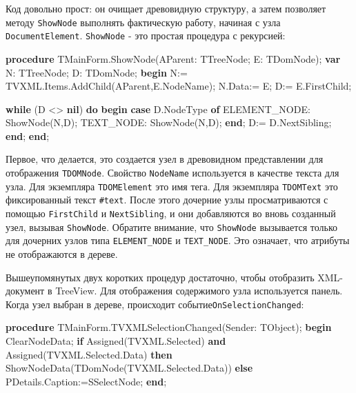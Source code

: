 \documentclass[
]{article}
\newenvironment{Shaded}{}{}
\newcommand{\KeywordTok}[1]{\textcolor[rgb]{0.00,0.44,0.13}{\textbf{#1}}}
\newcommand{\NormalTok}[1]{#1}
\begin{document}
Код довольно прост: он очищает древовидную структуру, а затем позволяет
методу \texttt{ShowNode} выполнять фактическую работу, начиная с узла
\texttt{DocumentElement}. \texttt{ShowNode} - это простая процедура с
рекурсией:

\begin{Shaded}
\begin{Highlighting}[]
\KeywordTok{procedure}\NormalTok{ TMainForm.ShowNode(AParent: TTreeNode; E: TDomNode);}
\KeywordTok{var}
\NormalTok{  N: TTreeNode;}
\NormalTok{  D: TDomNode;}
\KeywordTok{begin}
\NormalTok{  N:= TVXML.Items.AddChild(AParent,E.NodeName);}
\NormalTok{  N.Data:= E;}
\NormalTok{  D:= E.FirstChild;}

  \KeywordTok{while}\NormalTok{ (D \textless{}\textgreater{} }\KeywordTok{nil}\NormalTok{) }\KeywordTok{do}
  \KeywordTok{begin}
    \KeywordTok{case}\NormalTok{ D.NodeType }\KeywordTok{of}
\NormalTok{      ELEMENT\_NODE: ShowNode(N,D);}
\NormalTok{         TEXT\_NODE: ShowNode(N,D);}
    \KeywordTok{end}\NormalTok{;}
\NormalTok{    D:= D.NextSibling;}
  \KeywordTok{end}\NormalTok{;}
\KeywordTok{end}\NormalTok{;}
\end{Highlighting}
\end{Shaded}

Первое, что делается, это создается узел в древовидном представлении для
отображения \texttt{TDOMNode}. Свойство \texttt{NodeName} используется в
качестве текста для узла. Для экземпляра \texttt{TDOMElement} это имя
тега. Для экземпляра \texttt{TDOMText} это фиксированный текст
\texttt{\#text}. После этого дочерние узлы просматриваются с помощью
\texttt{FirstChild} и \texttt{NextSibling}, и они добавляются во вновь
созданный узел, вызывая \texttt{ShowNode}. Обратите внимание, что
\texttt{ShowNode} вызывается только для дочерних узлов типа
\texttt{ELEMENT\_NODE} и \texttt{TEXT\_NODE}. Это означает, что атрибуты
не отображаются в дереве.

Вышеупомянутых двух коротких процедур достаточно, чтобы отобразить
XML-документ в TreeView. Для отображения содержимого узла используется
панель. Когда узел выбран в дереве, происходит
событие\texttt{OnSelectionChanged}:

\begin{Shaded}
\begin{Highlighting}[]
\KeywordTok{procedure}\NormalTok{ TMainForm.TVXMLSelectionChanged(Sender: TObject);}
\KeywordTok{begin}
\NormalTok{  ClearNodeData;}
  \KeywordTok{if}\NormalTok{ Assigned(TVXML.Selected) }\KeywordTok{and}\NormalTok{ Assigned(TVXML.Selected.Data) }\KeywordTok{then}
\NormalTok{    ShowNodeData(TDomNode(TVXML.Selected.Data))}
    \KeywordTok{else}
\NormalTok{    PDetails.Caption:=SSelectNode;}
\KeywordTok{end}\NormalTok{;}
\end{Highlighting}
\end{Shaded}
\end{document}
